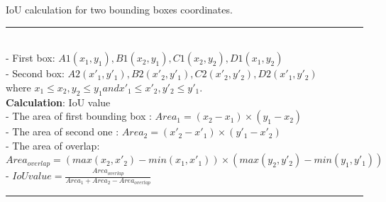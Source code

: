 \begin{algorithm}
 \caption{ IoU calculation for two bounding boxes coordinates.}
 \label{alg:iou_alg}
\SetAlgoLined
\noindent\rule{16cm}{0.4pt}\\
- First box: $A1(x_{1}, y_{1}), B1(x_{2}, y_{1}), C1(x_{2}, y_{2}), D1(x_{1}, y_{2})$\\
- Second box: $A2(x'_{1}, y'_{1}), B2(x'_{2}, y'_{1}), C2(x'_{2}, y'_{2}), D2(x'_{1}, y'_{2})$\\
  where $x_{1} \leq x_{2}, y_{2} \leq y_{1} and  x'_{1} \leq x'_{2}, y'_{2} \leq y'_{1}$.\\
\textbf{Calculation}: IoU value\\
- The area of first bounding box : $Area_{1} = (x_{2} - x_{1})\times (y_{1} - x_{2})$\\
- The area of second one : $Area_{2} = (x'_{2} - x'_{1})\times (y'_{1} - x'_{2})$\\
- The area of overlap: $Area_{overlap} = (max(x_{2},  x'_{2}) - min(x_{1},  x'_{1})) \times (max(y_{2},  y'_{2}) - min(y_{1},  y'_{1})) $\\
- $IoU value =\frac{Area_{overlap}}{Area_{1} +  Area_{2} - Area_{overlap}}$\\
\noindent\rule{16cm}{0.4pt}
\
\end{algorithm}
